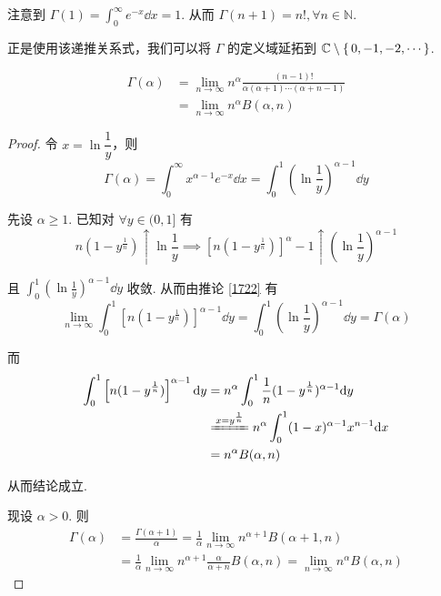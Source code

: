 注意到 $\Gamma(1)=\displaystyle\int_0^\infty e^{-x}\dd x=1$. 从而 $\Gamma(n+1)=n!,\forall n\in\mathbb{N}$.

\begin{hint}
    正是使用该递推关系式，我们可以将 $\Gamma$ 的定义域延拓到 $\mathbb{C}\setminus\set{0,-1,-2,\cdots}$.
\end{hint}


\begin{property}
$$
\begin{aligned}
    \Gamma(\alpha)&=\lim_{n\to\infty}n^\alpha\frac{(n-1)!}{\alpha(\alpha+1)\cdots(\alpha+n-1)}\\
    &=\lim_{n\to\infty}n^\alpha B(\alpha,n)
\end{aligned}
$$
\end{property}
\begin{proof}
    令 $x=\ln\dfrac{1}{y}$，则
$$
\Gamma(\alpha)=\int_0^\infty x^{\alpha-1}e^{-x}\dd x=\int_0^1\left(\ln\frac{1}{y}\right)^{\alpha-1}\dd y
$$

    先设 $\alpha\ge 1$. 已知对 $\forall y\in(0,1]$ 有
$$
n(1-y^\frac{1}{n})\uparrow\ln\frac{1}{y}\implies\left[n(1-y^\frac{1}{n})\right]^\alpha-1\uparrow\left(\ln\frac{1}{y}\right)^{\alpha-1}
$$

    且 $\displaystyle\int_0^1\left(\ln\frac{1}{y}\right)^{\alpha-1}\dd y$ 收敛. 从而由推论 \ref{1722} 有
$$
\lim_{n\to\infty}\int_0^1\left[n(1-y^\frac{1}{n})\right]^{\alpha-1}\dd y=\int_0^1\left(\ln\frac{1}{y}\right)^{\alpha-1}\dd y=\Gamma(\alpha)
$$

    而
$$
\begin{aligned}
    \int_0^1\left[n(1-y^\frac{1}{n})\right]^{\alpha-1}\dd y&=n^\alpha\int_0^1\frac{1}{n}(1-y^\frac{1}{n})^{\alpha-1}\dd y\\
    &\xlongequal{x=y^\frac{1}{n}}n^\alpha\int_0^1(1-x)^{\alpha-1}x^{n-1}\dd x\\
    &=n^\alpha B(\alpha,n)
\end{aligned}
$$

    从而结论成立.

    现设 $\alpha>0$. 则
$$
\begin{aligned}
    \Gamma(\alpha)&=\frac{\Gamma(\alpha+1)}{\alpha}=\frac{1}{\alpha}\lim_{n\to\infty}n^{\alpha+1}B(\alpha+1,n)\\
    &=\frac{1}{\alpha}\lim_{n\to\infty}n^{\alpha+1}\frac{\alpha}{\alpha+n}B(\alpha,n)=\lim_{n\to\infty}n^\alpha B(\alpha,n)
\end{aligned}
$$
\end{proof}